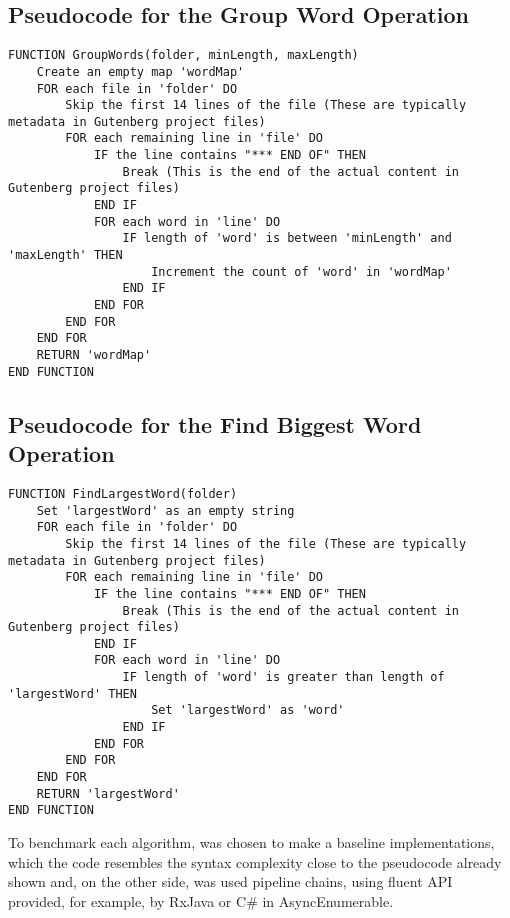 \subsection*{Pseudocode for the Group Word Operation}
\begin{lstlisting}[language={}, caption={Pseudocode for GroupWords function}, label={lst:groupwords}]
FUNCTION GroupWords(folder, minLength, maxLength)
    Create an empty map 'wordMap'
    FOR each file in 'folder' DO
        Skip the first 14 lines of the file (These are typically metadata in Gutenberg project files)
        FOR each remaining line in 'file' DO
            IF the line contains "*** END OF" THEN
                Break (This is the end of the actual content in Gutenberg project files)
            END IF
            FOR each word in 'line' DO
                IF length of 'word' is between 'minLength' and 'maxLength' THEN
                    Increment the count of 'word' in 'wordMap'
                END IF
            END FOR
        END FOR
    END FOR
    RETURN 'wordMap'
END FUNCTION
\end{lstlisting}

\clearpage

\subsection*{Pseudocode for the Find Biggest Word Operation}
\begin{lstlisting}[language={}, caption={Pseudocode for FindLargestWord function}, label={lst:findlargestword}]
FUNCTION FindLargestWord(folder)
    Set 'largestWord' as an empty string
    FOR each file in 'folder' DO
        Skip the first 14 lines of the file (These are typically metadata in Gutenberg project files)
        FOR each remaining line in 'file' DO
            IF the line contains "*** END OF" THEN
                Break (This is the end of the actual content in Gutenberg project files)
            END IF
            FOR each word in 'line' DO
                IF length of 'word' is greater than length of 'largestWord' THEN
                    Set 'largestWord' as 'word'
                END IF
            END FOR
        END FOR
    END FOR
    RETURN 'largestWord'
END FUNCTION
\end{lstlisting}

To benchmark each algorithm, was chosen to make a baseline implementations, which the code resembles the syntax complexity close to the pseudocode already shown and, on the other side, was used pipeline chains, using fluent API provided, for example, by RxJava or C\# in AsyncEnumerable.

